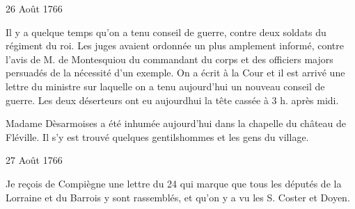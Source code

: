                      \begin{diary}{26 Août 1766}{}
                        
                         Il y a quelque temps qu'on a tenu conseil
                           de guerre, contre deux soldats du régiment du roi.
                           Les juges avaient ordonnée un plus amplement
                           informé, contre l'avis de M. de
                              Montesquiou
                           du commandant du corps et des officiers
                           majors persuadés de la nécessité d'un exemple.
                           On a écrit à la Cour et il est arrivé une
                           lettre du ministre sur
                           laquelle on a tenu
                           aujourd'hui un nouveau conseil de guerre.
                           Les deux déserteurs ont eu aujourdhui
                           la tête cassée à 3 h. après midi. \bigskip
        
        
                        
                           Madame Dèsarmoises a été inhumée
                           aujourd'hui dans la chapelle du
                              château
                              de Fléville. Il s'y est trouvé quelques
                           gentilshommes et les gens du village. \bigskip
        
        
                     \end{diary}

                     \begin{diary}{27 Août 1766}{}
                        
                         Je reçois de Compiègne une lettre du 24
                           qui marque que tous les députés de la Lorraine
                           et du Barrois y sont
                           rassemblés, et qu'on y
                           a vu les S.
                           Coster et Doyen. \bigskip
        
        
                     \end{diary}

